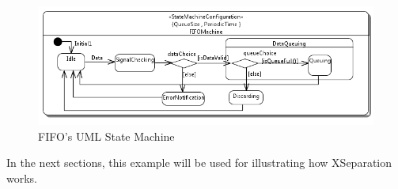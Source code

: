 \begin{figure}
	\centering
	\includegraphics[clip, trim=0.2cm 0cm 0cm 0.1cm, width=1.0\columnwidth]{figures/fifostatemachine.png}
	\caption{FIFO's UML State Machine} 
	\label{fig:fifostatemachine}
\end{figure}

In the next sections, this example will be used for illustrating how XSeparation works.


%

